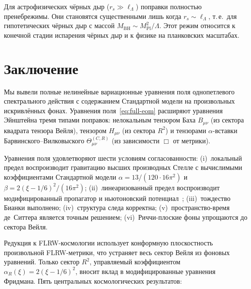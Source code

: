 \documentclass[12pt,a4paper]{article}
\newcommand{\Lam}{\Lambda}
\theoremstyle{plain}
\theoremstyle{definition}
\begin{document}
Для астрофизических чёрных дыр ($r_s \gg \ell_\Lam$) поправки
полностью пренебрежимы.  Они становятся существенными лишь когда
$r_s \sim \ell_\Lam$, т.\,е.\ для гипотетических чёрных дыр с массой
$M_{\mathrm{BH}} \sim M_{\mathrm{Pl}}^2/\Lam$.  Этот режим относится
к конечной стадии испарения чёрных дыр и к физике на планковских
масштабах.

\section{Заключение}
\label{sec:conclusions}

Мы вывели полные нелинейные вариационные уравнения поля однопетлевого
спектрального действия с содержанием Стандартной модели на произвольных
искривлённых фонах.  Уравнения поля~\eqref{eq:full-eom} расширяют
уравнения Эйнштейна тремя типами поправок: нелокальным тензором Баха
$B_{\mu\nu}$ (из сектора квадрата тензора Вейля), тензором $H_{\mu\nu}$
(из сектора $R^2$) и тензорами $\alpha$-вставки Барвинского--Вилковыского
$\Theta^{(C,R)}_{\mu\nu}$ (из зависимости $\Box$ от метрики).

Уравнения поля удовлетворяют шести условиям согласованности:
(i)~локальный предел воспроизводит гравитацию высших производных Стелле
с вычислимыми коэффициентами Стандартной модели
$\alpha = 13/(120 \cdot 16\pi^2)$ и
$\beta = 2(\xi-1/6)^2/(16\pi^2)$;
(ii)~линеаризованный предел воспроизводит модифицированный пропагатор и
ньютоновский потенциал~\cite{Alfyorov:2026ss};
(iii)~тождество Бианки выполнено;
(iv)~структура следа корректна;
(v)~пространство-время де~Ситтера является точным решением;
(vi)~Риччи-плоские фоны упрощаются до сектора Вейля.

Редукция к FLRW-космологии использует конформную плоскостность произвольной
FLRW-метрики, что устраняет весь сектор Вейля из фоновых уравнений.
Только сектор $R^2$, управляемый коэффициентом
$\alpha_R(\xi) = 2(\xi - 1/6)^2$, вносит вклад в модифицированные
уравнения Фридмана.  Пять центральных космологических результатов:
\end{document}
